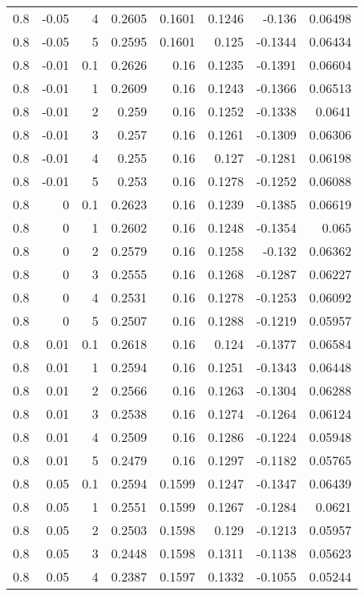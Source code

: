 \documentclass{amsart}
\theoremstyle{plain}
\numberwithin{equation}{section}
\begin{document}
\begin{longtable}{r | r | r | r | r | r | r | r}
0.8 & -0.05 & 4 & 0.2605 & 0.1601 & 0.1246 & -0.136 & 0.06498 \\
0.8 & -0.05 & 5 & 0.2595 & 0.1601 & 0.125 & -0.1344 & 0.06434 \\ \hline
0.8 & -0.01 & 0.1 & 0.2626 & 0.16 & 0.1235 & -0.1391 & 0.06604 \\
0.8 & -0.01 & 1 & 0.2609 & 0.16 & 0.1243 & -0.1366 & 0.06513 \\
0.8 & -0.01 & 2 & 0.259 & 0.16 & 0.1252 & -0.1338 & 0.0641 \\
0.8 & -0.01 & 3 & 0.257 & 0.16 & 0.1261 & -0.1309 & 0.06306 \\
0.8 & -0.01 & 4 & 0.255 & 0.16 & 0.127 & -0.1281 & 0.06198 \\
0.8 & -0.01 & 5 & 0.253 & 0.16 & 0.1278 & -0.1252 & 0.06088 \\ \hline
0.8 & 0 & 0.1 & 0.2623 & 0.16 & 0.1239 & -0.1385 & 0.06619 \\
0.8 & 0 & 1 & 0.2602 & 0.16 & 0.1248 & -0.1354 & 0.065 \\
0.8 & 0 & 2 & 0.2579 & 0.16 & 0.1258 & -0.132 & 0.06362 \\
0.8 & 0 & 3 & 0.2555 & 0.16 & 0.1268 & -0.1287 & 0.06227 \\
0.8 & 0 & 4 & 0.2531 & 0.16 & 0.1278 & -0.1253 & 0.06092 \\
0.8 & 0 & 5 & 0.2507 & 0.16 & 0.1288 & -0.1219 & 0.05957 \\ \hline
0.8 & 0.01 & 0.1 & 0.2618 & 0.16 & 0.124 & -0.1377 & 0.06584 \\
0.8 & 0.01 & 1 & 0.2594 & 0.16 & 0.1251 & -0.1343 & 0.06448 \\
0.8 & 0.01 & 2 & 0.2566 & 0.16 & 0.1263 & -0.1304 & 0.06288 \\
0.8 & 0.01 & 3 & 0.2538 & 0.16 & 0.1274 & -0.1264 & 0.06124 \\
0.8 & 0.01 & 4 & 0.2509 & 0.16 & 0.1286 & -0.1224 & 0.05948 \\
0.8 & 0.01 & 5 & 0.2479 & 0.16 & 0.1297 & -0.1182 & 0.05765 \\ \hline
0.8 & 0.05 & 0.1 & 0.2594 & 0.1599 & 0.1247 & -0.1347 & 0.06439 \\
0.8 & 0.05 & 1 & 0.2551 & 0.1599 & 0.1267 & -0.1284 & 0.0621 \\
0.8 & 0.05 & 2 & 0.2503 & 0.1598 & 0.129 & -0.1213 & 0.05957 \\
0.8 & 0.05 & 3 & 0.2448 & 0.1598 & 0.1311 & -0.1138 & 0.05623 \\
0.8 & 0.05 & 4 & 0.2387 & 0.1597 & 0.1332 & -0.1055 & 0.05244 \\

\end{longtable}
\end{document}
